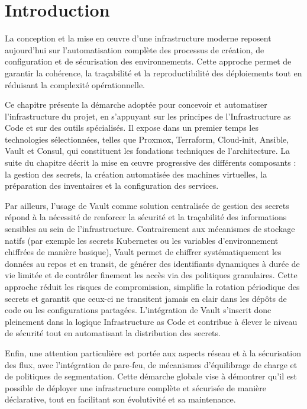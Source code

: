 \thispagestyle{mainmatter}

\section{Introduction}

La conception et la mise en œuvre d’une infrastructure moderne reposent aujourd’hui sur l’automatisation complète des processus de création, de configuration et de sécurisation des environnements. Cette approche permet de garantir la cohérence, la traçabilité et la reproductibilité des déploiements tout en réduisant la complexité opérationnelle.

Ce chapitre présente la démarche adoptée pour concevoir et automatiser l’infrastructure du projet, en s’appuyant sur les principes de l’Infrastructure as Code et sur des outils spécialisés. Il expose dans un premier temps les technologies sélectionnées, telles que Proxmox, Terraform, Cloud-init, Ansible, Vault et Consul, qui constituent les fondations techniques de l’architecture. La suite du chapitre décrit la mise en œuvre progressive des différents composants : la gestion des secrets, la création automatisée des machines virtuelles, la préparation des inventaires et la configuration des services.

Par ailleurs, l’usage de Vault comme solution centralisée de gestion des secrets répond à la nécessité de renforcer la sécurité et la traçabilité des informations sensibles au sein de l’infrastructure. Contrairement aux mécanismes de stockage natifs (par exemple les secrets Kubernetes ou les variables d’environnement chiffrées de manière basique), Vault permet de chiffrer systématiquement les données au repos et en transit, de générer des identifiants dynamiques à durée de vie limitée et de contrôler finement les accès via des politiques granulaires. Cette approche réduit les risques de compromission, simplifie la rotation périodique des secrets et garantit que ceux-ci ne transitent jamais en clair dans les dépôts de code ou les configurations partagées. L’intégration de Vault s’inscrit donc pleinement dans la logique Infrastructure as Code et contribue à élever le niveau de sécurité tout en automatisant la distribution des secrets.

Enfin, une attention particulière est portée aux aspects réseau et à la sécurisation des flux, avec l’intégration de pare-feu, de mécanismes d’équilibrage de charge et de politiques de segmentation. Cette démarche globale vise à démontrer qu’il est possible de déployer une infrastructure complète et sécurisée de manière déclarative, tout en facilitant son évolutivité et sa maintenance.
